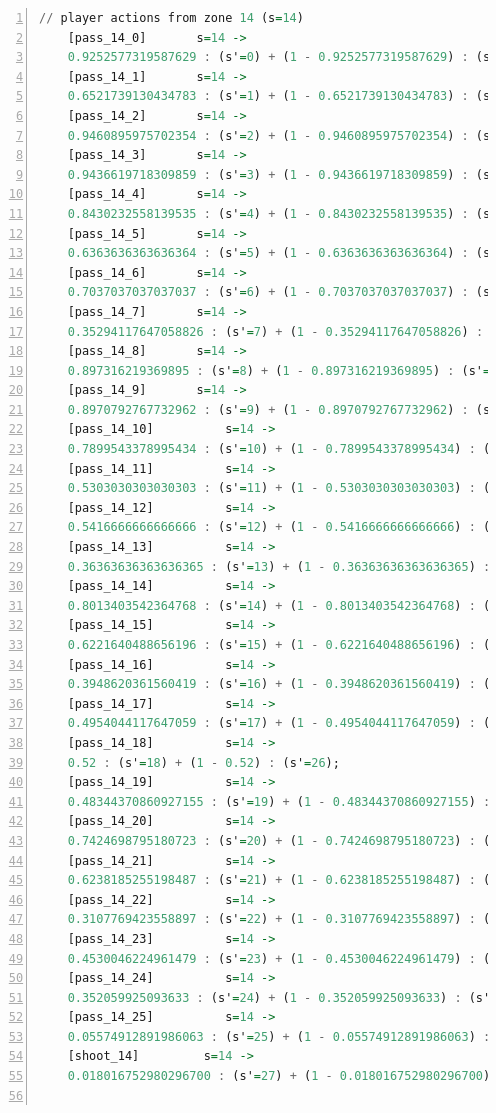 \documentclass{l4proj}
\begin{document}
\begin{appendices}
\begin{lstlisting}[language=Haskell, numbers=left, caption=MDP used for strategy generation. This is the model specification as-is after the refinements at the end of chapter 3.]
	// player actions from zone 14 (s=14)
	[pass_14_0]	      s=14 ->
	0.9252577319587629 : (s'=0) + (1 - 0.9252577319587629) : (s'=26);
	[pass_14_1]	      s=14 ->
	0.6521739130434783 : (s'=1) + (1 - 0.6521739130434783) : (s'=26);
	[pass_14_2]	      s=14 ->
	0.9460895975702354 : (s'=2) + (1 - 0.9460895975702354) : (s'=26);
	[pass_14_3]	      s=14 ->
	0.9436619718309859 : (s'=3) + (1 - 0.9436619718309859) : (s'=26);
	[pass_14_4]	      s=14 ->
	0.8430232558139535 : (s'=4) + (1 - 0.8430232558139535) : (s'=26);
	[pass_14_5]	      s=14 ->
	0.6363636363636364 : (s'=5) + (1 - 0.6363636363636364) : (s'=26);
	[pass_14_6]	      s=14 ->
	0.7037037037037037 : (s'=6) + (1 - 0.7037037037037037) : (s'=26);
	[pass_14_7]	      s=14 ->
	0.35294117647058826 : (s'=7) + (1 - 0.35294117647058826) : (s'=26);
	[pass_14_8]	      s=14 ->
	0.897316219369895 : (s'=8) + (1 - 0.897316219369895) : (s'=26);
	[pass_14_9]	      s=14 ->
	0.8970792767732962 : (s'=9) + (1 - 0.8970792767732962) : (s'=26);
	[pass_14_10]	      s=14 ->
	0.7899543378995434 : (s'=10) + (1 - 0.7899543378995434) : (s'=26);
	[pass_14_11]	      s=14 ->
	0.5303030303030303 : (s'=11) + (1 - 0.5303030303030303) : (s'=26);
	[pass_14_12]	      s=14 ->
	0.5416666666666666 : (s'=12) + (1 - 0.5416666666666666) : (s'=26);
	[pass_14_13]	      s=14 ->
	0.36363636363636365 : (s'=13) + (1 - 0.36363636363636365) : (s'=26);
	[pass_14_14]	      s=14 ->
	0.8013403542364768 : (s'=14) + (1 - 0.8013403542364768) : (s'=26);
	[pass_14_15]	      s=14 ->
	0.6221640488656196 : (s'=15) + (1 - 0.6221640488656196) : (s'=26);
	[pass_14_16]	      s=14 ->
	0.3948620361560419 : (s'=16) + (1 - 0.3948620361560419) : (s'=26);
	[pass_14_17]	      s=14 ->
	0.4954044117647059 : (s'=17) + (1 - 0.4954044117647059) : (s'=26);
	[pass_14_18]	      s=14 ->
	0.52 : (s'=18) + (1 - 0.52) : (s'=26);
	[pass_14_19]	      s=14 ->
	0.48344370860927155 : (s'=19) + (1 - 0.48344370860927155) : (s'=26);
	[pass_14_20]	      s=14 ->
	0.7424698795180723 : (s'=20) + (1 - 0.7424698795180723) : (s'=26);
	[pass_14_21]	      s=14 ->
	0.6238185255198487 : (s'=21) + (1 - 0.6238185255198487) : (s'=26);
	[pass_14_22]	      s=14 ->
	0.3107769423558897 : (s'=22) + (1 - 0.3107769423558897) : (s'=26);
	[pass_14_23]	      s=14 ->
	0.4530046224961479 : (s'=23) + (1 - 0.4530046224961479) : (s'=26);
	[pass_14_24]	      s=14 ->
	0.352059925093633 : (s'=24) + (1 - 0.352059925093633) : (s'=26);
	[pass_14_25]	      s=14 ->
	0.05574912891986063 : (s'=25) + (1 - 0.05574912891986063) : (s'=26);
	[shoot_14]	       s=14 ->
	0.018016752980296700 : (s'=27) + (1 - 0.018016752980296700) : (s'=26);


\end{lstlisting}
\end{appendices}
\end{document}
